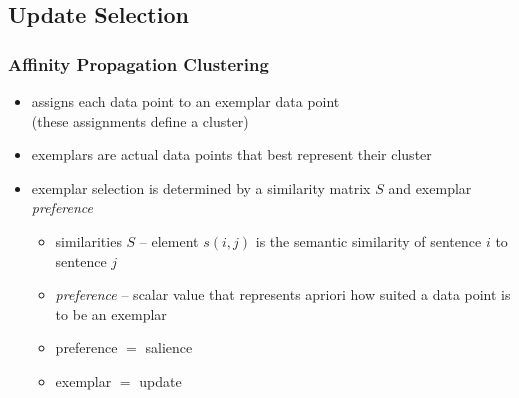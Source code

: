 \documentclass{beamer}
\begin{document}
\subsection{Update Selection}
\begin{frame}
\frametitle{Affinity Propagation Clustering}
\begin{itemize}
\pause
\item assigns each data point to an exemplar data point \\
     (these assignments
      define a cluster)
\pause
\item exemplars are actual data points that best represent their cluster
\pause
\item exemplar selection is determined by a similarity matrix $S$ and 
      exemplar \textit{preference}
\pause
\begin{itemize}
\pause 
\item similarities $S$ -- element $s(i,j)$ is the semantic similarity of sentence $i$ to sentence $j$
\pause
\item \textit{preference} -- scalar value that represents 
      apriori how suited a data point is to be an exemplar
\pause
\item \alert<+->{preference $=$ salience}
\pause
\item \alert<+->{exemplar $=$ update}
\end{itemize}

\end{itemize}


\end{frame}
\end{document}
